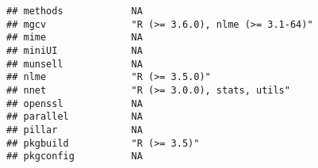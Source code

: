 \documentclass[
]{article}
\begin{document}
\begin{verbatim}
## methods            NA                                                                                                                                                                                                    
## mgcv               "R (>= 3.6.0), nlme (>= 3.1-64)"                                                                                                                                                                      
## mime               NA                                                                                                                                                                                                    
## miniUI             NA                                                                                                                                                                                                    
## munsell            NA                                                                                                                                                                                                    
## nlme               "R (>= 3.5.0)"                                                                                                                                                                                        
## nnet               "R (>= 3.0.0), stats, utils"                                                                                                                                                                          
## openssl            NA                                                                                                                                                                                                    
## parallel           NA                                                                                                                                                                                                    
## pillar             NA                                                                                                                                                                                                    
## pkgbuild           "R (>= 3.5)"                                                                                                                                                                                          
## pkgconfig          NA                                                                                                                                                                                                    

\end{verbatim}
\end{document}
